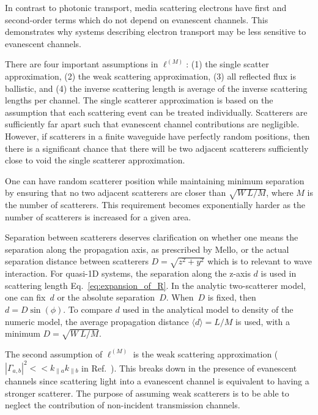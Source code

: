 In contrast to photonic transport, media scattering electrons have first and second-order terms which do not depend on evanescent channels. This demonstrates why systems describing electron transport may be less sensitive to evanescent channels. %

There are four important assumptions in $\ell^{(M)}$: (1) the single scatter approximation, (2) the weak scattering approximation, (3) all reflected flux is ballistic, and (4) the inverse scattering length is average of the inverse scattering lengths per channel. The single scatterer approximation is based on the assumption that each scattering event can be treated individually. Scatterers are sufficiently far apart such that evanescent channel contributions are negligible. However, if scatterers in a finite waveguide have perfectly random positions, then there is a significant chance that there will be two adjacent  scatterers sufficiently close to void the single scatterer approximation.  

One can have random scatterer position while maintaining minimum  separation by ensuring that no two adjacent scatterers are closer than $\sqrt{W \ L/M}$, where $M$ is the number of scatterers. This requirement becomes exponentially harder as the number of scatterers is increased for a given area. %

Separation between scatterers deserves clarification on whether one means the separation along the propagation axis, as prescribed by Mello, or the actual separation distance between scatterers $D=\sqrt{z^2+y^2}$ which is to relevant to wave interaction. For quasi-1D systems, the separation along the z-axis $d$ is used in scattering length Eq.~\ref{eq:expansion_of_R}. In the analytic two-scatterer model, one can fix~$d$ or the absolute separation~$D$. When~$D$ is fixed, then $d=D \sin(\phi)$. To compare $d$ used in the analytical model to density of the numeric model, the average propagation distance $\langle d \rangle=L/M$ is used, with a minimum $D=\sqrt{W\ L/M}$.

The second assumption of $\ell^{(M)}$ is the weak scattering approximation ($|\Gamma_{a,b}|^2<<k_{\parallel a}k_{\parallel b}$ 
in Ref.~). This breaks down in the presence of evanescent channels since scattering light into a evanescent channel is equivalent to having a stronger scatterer. The purpose of assuming weak scatterers is to be able to neglect the contribution of non-incident transmission channels. 

